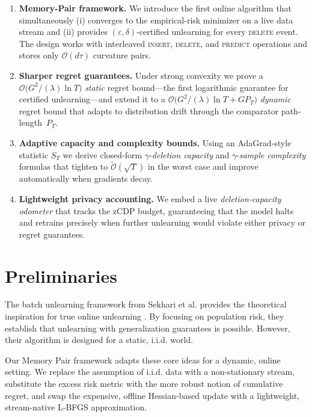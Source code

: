 \documentclass[a4paper,12pt]{article}
\begin{document}
\begin{enumerate}
    \item \textbf{Memory‐Pair framework.}  We introduce the first online algorithm that simultaneously (i) converges to the empirical-risk minimizer on a live data stream and (ii) provides $(\varepsilon,\delta)$-certified unlearning for every \textsc{delete} event.  The design works with interleaved \textsc{insert}, \textsc{delete}, and \textsc{predict} operations and stores only $\mathcal{O}(d\tau)$ curvature pairs. 
    
    \item \textbf{Sharper regret guarantees.}  Under strong convexity we prove a \(\mathcal{O}\!\bigl(G^{2}/(\lambda)\ln T\bigr)\) \emph{static} regret bound—the first logarithmic guarantee for certified unlearning—and extend it to a \(\mathcal{O}\!\bigl(G^{2}/(\lambda)\ln T + G P_T\bigr)\) \emph{dynamic} regret bound that adapts to distribution drift through the comparator path-length~\(P_T\).

    \item \textbf{Adaptive capacity and complexity bounds.}  Using an AdaGrad-style statistic \(S_T\) we derive closed-form $\gamma$-\emph{deletion capacity} and $\gamma$-\emph{sample complexity} formulas that tighten to \(\widetilde{\mathcal{O}}(\sqrt{T})\) in the worst case and improve automatically when gradients decay.

    \item \textbf{Lightweight privacy accounting.}  We embed a live \emph{deletion‐capacity odometer} that tracks the zCDP budget, guaranteeing that the model halts and retrains precisely when further unlearning would violate either privacy or regret guarantees.  
\end{enumerate}

\section{Preliminaries}
\label{sec:prelim}

The batch unlearning framework from Sekhari et al. provides the theoretical inspiration for true online unlearning \cite{Sekhari_Acharya_Kamath_Suresh_2021-03}. By focusing on population risk, they establish that unlearning with generalization guarantees is possible. However, their algorithm is designed for a static, i.i.d. world.

Our Memory Pair framework adapts these core ideas for a dynamic, online setting. We replace the assumption of i.i.d. data with a non-stationary stream, substitute the excess risk metric with the more robust notion of cumulative regret, and swap the expensive, offline Hessian-based update with a lightweight, stream-native L-BFGS approximation\cite{Mokhtari_Ribeiro_2014-09}. 
\end{document}

